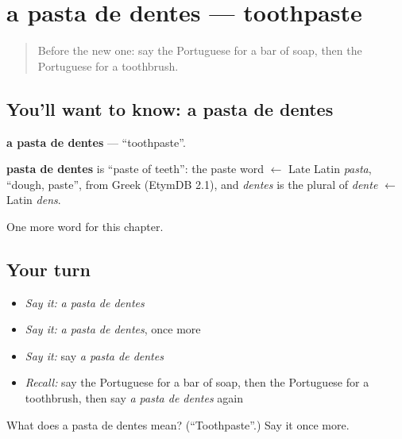 \section[a pasta de dentes]{a pasta de dentes — toothpaste}

\label{lesson:PT-C95-pasta-de-dentes}



\begin{quote}
Before the new one: say the Portuguese for a bar of soap, then the Portuguese for a toothbrush.
\end{quote}

\subsection*{You'll want to know: a pasta de dentes}
\textbf{a pasta de dentes} — \textquotedblleft{}toothpaste\textquotedblright{}.

\begin{cousinweb}
\textbf{pasta de dentes} is \textquotedblleft{}paste of teeth\textquotedblright{}: the paste word $\leftarrow$ Late Latin \emph{pasta}, \textquotedblleft{}dough, paste\textquotedblright{}, from Greek (EtymDB 2.1), and \emph{dentes} is the plural of \emph{dente} $\leftarrow$ Latin \emph{dens}.
\end{cousinweb}

\begin{grammarlens}[title={What you've built}]
One more word for this chapter.
\end{grammarlens}

\subsection*{Your turn}
\begin{itemize}
\raggedright
  \item \emph{Say it:} \emph{a pasta de dentes}
  \item \emph{Say it:} \emph{a pasta de dentes}, once more
  \item \emph{Say it:} say \emph{a pasta de dentes}
  \item \emph{Recall:} say the Portuguese for a bar of soap, then the Portuguese for a toothbrush, then say \emph{a pasta de dentes} again
\end{itemize}

\begin{tcolorbox}[breakable,colback=teal!4,colframe=teal!35!black,title={Before you move on}]
What does a pasta de dentes mean? (\textquotedblleft{}Toothpaste\textquotedblright{}.) Say it once more.
\end{tcolorbox}

